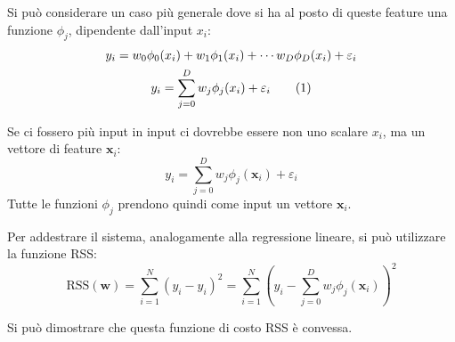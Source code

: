 \documentclass{article}
\numberwithin{equation}{subsection}
\newcommand{\tageq}{\tag{\stepcounter{equation}\theequation}}
\newcommand{\vect}[1]{\boldsymbol{\mathbf{#1}}}
\begin{document}
Si può considerare un caso più generale dove si ha al posto di queste feature una funzione $\phi_j$, dipendente dall'input $x_i$:
\begin{gather*}
    y_i=w_0\phi_0(x_i)+w_1\phi_1(x_i)+\cdots w_D\phi_D(x_i)+\varepsilon_i\\
    y_i=\displaystyle\sum_{j=0}^Dw_j\phi_j(x_i)+\varepsilon_i\tageq
\end{gather*}

Se ci fossero più input in input ci dovrebbe essere non uno scalare $x_i$, ma un vettore di feature $\vect{x}_i$:
\begin{equation}
    y_i=\displaystyle\sum_{j=0}^Dw_j\phi_j(\vect{x}_i)+\varepsilon_i
\end{equation}
Tutte le funzioni $\phi_j$ prendono quindi come input un vettore $\vect{x}_i$. 


Per addestrare il sistema, analogamente alla regressione lineare, si può utilizzare la funzione RSS:
\begin{equation*}
    \text{RSS}(\vect{w})=\displaystyle\sum_{i=1}^N(y_i-\hat{y}_i)^2=\sum_{i=1}^N\left(y_i-\sum_{j=0}^Dw_j\phi_j(\vect{x}_i)\right)^2
\end{equation*}

Si può dimostrare che questa funzione di costo RSS è convessa. 

\end{document}
